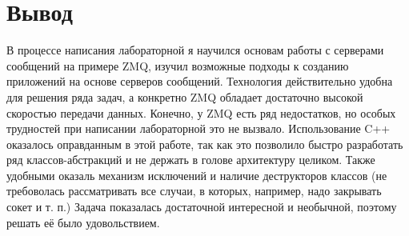 \section{Вывод}

В процессе написания лабораторной я научился основам работы с серверами сообщений на примере ZMQ, изучил возможные подходы к созданию приложений на основе серверов сообщений. Технология действительно удобна для решения ряда задач, а конкретно ZMQ обладает достаточно высокой скоростью передачи данных. Конечно, у ZMQ есть ряд недостатков, но особых трудностей при написании лабораторной это не вызвало. Использование C++ оказалось оправданным в этой работе, так как это позволило быстро разработать ряд классов-абстракций и не держать в голове архитектуру целиком. Также удобными оказаль механизм исключений и наличие деструкторов классов (не требоволась рассматривать все случаи, в которых, например, надо закрывать сокет и т. п.) Задача показалась достаточной интересной и необычной, поэтому решать её было удовольствием. 

